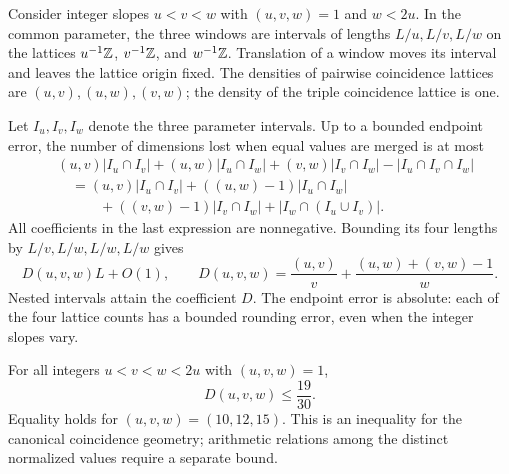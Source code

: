 Consider integer slopes $u<v<w$ with $(u,v,w)=1$ and $w<2u$.
In the common parameter, the three windows are intervals of lengths
$L/u,L/v,L/w$ on the lattices $u^{-1}\mathbb Z$, $v^{-1}\mathbb Z$, and
$w^{-1}\mathbb Z$.  Translation of a window moves its interval and leaves
the lattice origin fixed.  The densities of pairwise coincidence
lattices are $(u,v),(u,w),(v,w)$; the density of the triple coincidence
lattice is one.

Let $I_u,I_v,I_w$ denote the three parameter intervals.  Up to a bounded
endpoint error, the number of dimensions lost when equal values are
merged is at most
\begin{align*}
 &(u,v)|I_u\cap I_v|+(u,w)|I_u\cap I_w|
       +(v,w)|I_v\cap I_w|-|I_u\cap I_v\cap I_w|\\
 &\quad=(u,v)|I_u\cap I_v|+((u,w)-1)|I_u\cap I_w|\\
 &\qquad\quad+((v,w)-1)|I_v\cap I_w|
                         +|I_w\cap(I_u\cup I_v)|.
\end{align*}
All coefficients in the last expression are nonnegative.  Bounding its
four lengths by $L/v,L/w,L/w,L/w$ gives
\begin{equation}
 D(u,v,w)L+O(1),\qquad
 D(u,v,w)=\frac{(u,v)}v+\frac{(u,w)+(v,w)-1}{w}.
 \label{p13:third:density}
\end{equation}
Nested intervals attain the coefficient $D$.
The endpoint error is absolute: each of the four lattice counts has a
bounded rounding error, even when the integer slopes vary.

\begin{lemma}
\label{p13:third:rational-rank}
For all integers $u<v<w<2u$ with $(u,v,w)=1$,
\begin{equation}
 D(u,v,w)\leq\frac{19}{30}.
 \label{p13:third:1930}
\end{equation}
Equality holds for $(u,v,w)=(10,12,15)$.
This is an inequality for the canonical coincidence geometry; arithmetic
relations among the distinct normalized values require a separate bound.
\end{lemma}

